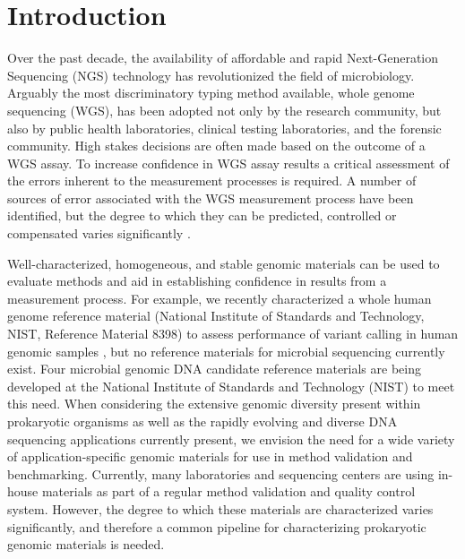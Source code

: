 \documentclass[smallextended]{svjour3}\usepackage[]{graphicx}\usepackage[]{color}
\begin{document}
\section{Introduction}
\label{intro}
Over the past decade, the availability of affordable and rapid Next-Generation Sequencing (NGS) technology has revolutionized the field of microbiology. Arguably the most discriminatory typing method available, whole genome sequencing (WGS), has been adopted not only by the research community, but also by public health laboratories, clinical testing laboratories, and the forensic community. High stakes decisions are often made based on the outcome of a WGS assay. To increase confidence in WGS assay results a critical assessment of the errors inherent to the measurement processes is required. A number of sources of error associated with the WGS measurement process have been identified, but the degree to which they can be predicted, controlled or compensated varies significantly \cite{Olson2015}. 

Well-characterized, homogeneous, and stable genomic materials can be used to evaluate methods and aid in establishing confidence in results from a measurement process. For example, we recently characterized a whole human genome reference material (National Institute of Standards and Technology, NIST, Reference Material 8398) to assess performance of variant calling in human genomic samples \cite{Zook2014}, but no reference materials for microbial sequencing currently exist. Four microbial genomic DNA candidate reference materials are being developed at the National Institute of Standards and Technology (NIST) to meet this need. When considering the extensive genomic diversity present within prokaryotic organisms as well as the rapidly evolving and diverse DNA sequencing applications currently present, we envision the need for a wide variety of application-specific genomic materials for use in method validation and benchmarking. Currently, many laboratories and sequencing centers are using in-house materials as part of a regular method validation and quality control system. However, the degree to which these materials are characterized varies significantly, and therefore a common pipeline for characterizing prokaryotic genomic materials is needed.
\end{document}
